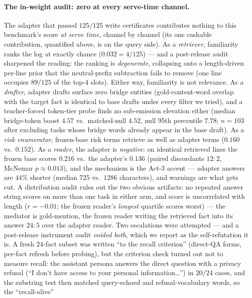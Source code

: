 \documentclass[11pt]{article}
\begin{document}
\paragraph{The in-weight audit: zero at every serve-time channel.} The adapter that passed
$125/125$ write certificates contributes nothing to this benchmark's score \emph{at serve
time}, channel by channel (its one cashable contribution, quantified above, is on the
query side). As a \emph{retriever}, familiarity ranks the log at exactly chance ($0.032 = 4/125$) ---
and a post-release audit sharpened the reading: the ranking is \emph{degenerate}, collapsing
onto a length-driven per-line prior that the neutral-prefix subtraction fails to remove (one
line occupies $89/125$ of the top-4 slots). Either way, familiarity is not relevance. As a \emph{drafter}, adapter
drafts surface zero bridge entities (gold-content-word overlap with the target fact is
identical to base drafts under every filter we tried), and a teacher-forced token-tier probe finds no sub-emission elevation either
(median bridge-token boost $4.57$ vs.\ matched-null $4.52$, null 95th percentile $7.78$;
$n{=}103$ after excluding tasks whose bridge words already appear in the base draft). As a
\emph{risk enumerator}, frozen-base risk terms retrieve as well as adapter terms ($0.160$ vs.\
$0.152$). As a \emph{reader}, the adapter is \emph{negative}: on identical retrieved lines the
frozen base scores $0.216$ vs.\ the adapter's $0.136$ (paired discordants $12{:}2$,
McNemar $p \approx 0.013$), and the mechanism is the Act-3 accent --- adapter answers are
$44\%$ shorter (median $725$ vs.\ $1286$ characters), and warnings are what gets cut. A
distribution audit rules out the two obvious artifacts: no repeated answer string scores on
more than one task in either arm, and score is uncorrelated with length ($r{=}-0.01$; the
frozen reader's \emph{longest} quartile scores worst) --- the mediator is gold-mention, the
frozen reader writing the retrieved fact into its answer $24{:}5$ over the adapter reader. Two
escalations were attempted --- and a post-release instrument audit \emph{voided both}, which we
report as the self-refutation it is. A fresh $24$-fact subset was written ``to the recall
criterion'' (direct-QA forms, per-fact refresh before probing), but the criterion check turned
out not to measure recall: the assistant persona answers the direct question with a privacy
refusal (``I don't have access to your personal information\ldots'') in $20/24$ cases, and the
substring test then matched query-echoed and refusal-vocabulary words, so the ``recall-alive''
\end{document}
